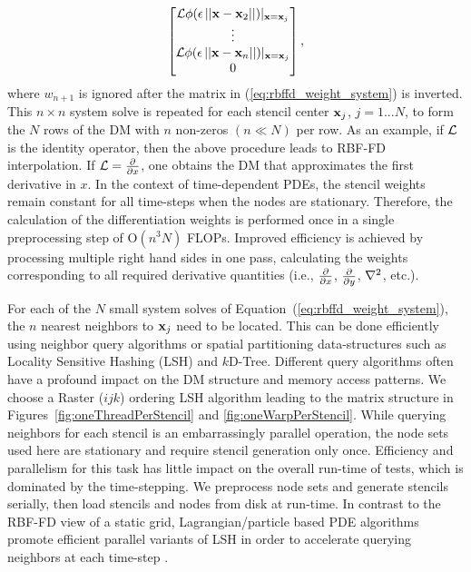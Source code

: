 \documentclass{report}
\begin{document}
{\begin{align}
\begin{bmatrix}
                \mathcal{L}\phi(\epsilon\left|\left|\mathbf{x}-\mathbf{x}_{2}\right|\right|)|_{\mathbf{x}=\mathbf{x}_{j}} \\ \vdots \\  \mathcal{L}\phi(\epsilon\left|\left|\mathbf{x}-\mathbf{x}_{n}\right|\right|)|_{\mathbf{x}=\mathbf{x}_{j}}\\
                0
\end{bmatrix},
\label{eq:rbffd_weight_system}
\end{align}
where $w_{n+1}$ is ignored after the matrix in ({\ref{eq:rbffd_weight_system}}) is inverted.
This $n \times n$ system solve is repeated for each stencil center  $\mathbf{x}_j$, $j=1...N$, to form the $N$ rows of the DM  with $n$ non-zeros $(n\ll N)$ per row.
As an example, if $\diffop$ is the identity operator, 
then the above procedure leads to RBF-FD interpolation. If $\mathcal{L}=\frac{\partial }{\partial x}$, one obtains the DM that approximates the first derivative in $x$. In the context of time-dependent PDEs,  the stencil weights remain constant for all time-steps when the nodes are stationary. Therefore, the calculation of the 
differentiation weights is performed once in a single preprocessing step of O$(n^3N)$ 
FLOPs.
Improved efficiency is achieved
by processing multiple right hand sides in one pass, calculating the weights
corresponding to all required derivative quantities (i.e., $\frac{\partial }{\partial x}$, $\frac{\partial }{\partial y}$, $\Laplacian$, etc.).


For each of the $N$ small system solves of Equation~(\ref{eq:rbffd_weight_system}), the $n$ nearest neighbors to $\mathbf{x}_j$ need to be located. This can be done efficiently using neighbor query algorithms or spatial partitioning data-structures such as Locality Sensitive Hashing (LSH) and $k$D-Tree. Different query algorithms often have a profound impact on the DM structure and memory access patterns. We choose a Raster ($ijk$) ordering LSH algorithm \cite{Bollig2011} leading to the matrix structure in Figures~\ref{fig:oneThreadPerStencil} and \ref{fig:oneWarpPerStencil}. While querying neighbors for each stencil is an embarrassingly parallel operation, the node sets used here are stationary and require stencil generation only once. Efficiency and parallelism for this task has little impact on the overall run-time of tests, which is dominated by the time-stepping. We preprocess node sets and generate stencils serially, then load stencils and nodes from disk at run-time. In contrast to the RBF-FD view of a static grid, Lagrangian/particle based PDE algorithms promote efficient parallel variants of LSH in order to accelerate querying neighbors at each time-step \cite{Pan2011, Goswami2010}. 


}
\end{document}
